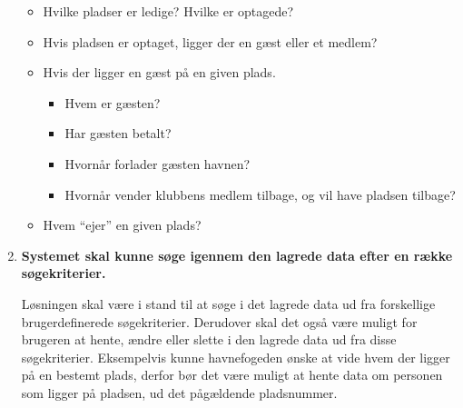 \begin{enumerate}
  \begin{itemize}
  \item Hvilke pladser er ledige? Hvilke er optagede?
  \item Hvis pladsen er optaget, ligger der en gæst eller et medlem?
  \item Hvis der ligger en gæst på en given plads.
    \begin{itemize}
      \item Hvem er gæsten?
      \item Har gæsten betalt?
      \item Hvornår forlader gæsten havnen?
      \item Hvornår vender klubbens medlem tilbage, og vil have pladsen tilbage?
    \end{itemize}
  \item Hvem \enquote{ejer} en given plads?
  \end{itemize}

\item \label{itm:soege} \textbf{Systemet skal kunne søge igennem den lagrede data efter en række søgekriterier.}

  Løsningen skal være i stand til at søge i det lagrede data ud fra forskellige brugerdefinerede søgekriterier. Derudover skal det også være muligt for brugeren at hente, ændre eller slette i den lagrede data ud fra disse søgekriterier. Eksempelvis kunne havnefogeden ønske at vide hvem der ligger på en bestemt plads, derfor bør det være muligt at hente data om personen som ligger på pladsen, ud det pågældende pladsnummer.

\end{enumerate}

